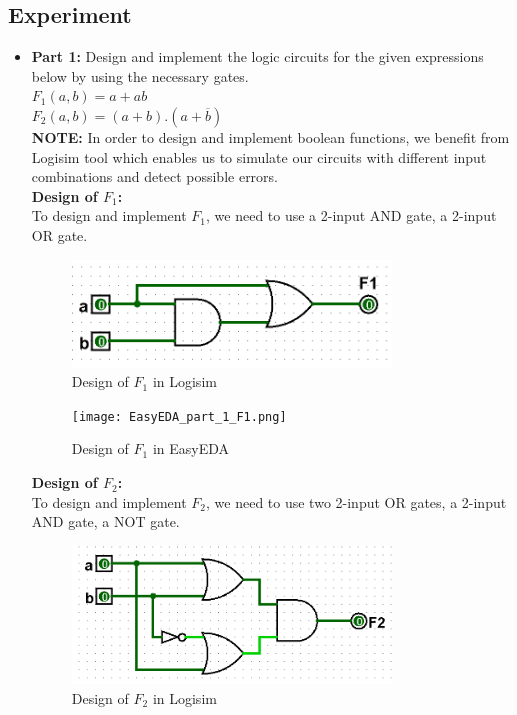 \documentclass[pdftex,12pt,a4paper]{article}
\begin{document}
\subsection{Experiment}
\begin{itemize}
    \item \textbf{Part 1:} Design and implement the logic circuits for the given expressions below by using the necessary gates.\\
    $F_1 (a, b) = a + ab$ \\
    $F_2 (a, b) = (a + b) . (a + \overline{b})$\\

    \textbf{NOTE:} In order to design and implement boolean functions, we benefit from Logisim tool which enables us to simulate our circuits with different input combinations and detect possible errors.\\
    
    \newpage
    \textbf{Design of $F_1$:}\\
    To design and implement $F_1$, we need to use a 2-input AND gate, a 2-input OR gate.\\

    \begin{figure}[H]
    \centering
        \includegraphics[width=0.8\textwidth]{F1.png}	
        \caption{Design of \textbf{$F_1$} in Logisim}
   \end{figure}
   
   \begin{figure}[H]
    \centering
        \texttt{[image: EasyEDA\_part\_1\_F1.png]}	
        \caption{Design of \textbf{$F_1$} in EasyEDA}
   \end{figure}
   
   \textbf{Design of $F_2$:} \\ 
    To design and implement $F_2$, we need to use two 2-input OR gates, a 2-input AND gate, a NOT gate.\\

    \begin{figure}[H]
    \centering
        \includegraphics[width=0.8\textwidth]{F2.png}	
        \caption{Design of \textbf{$F_2$} in Logisim}
   \end{figure}


\end{itemize}
\end{document}

